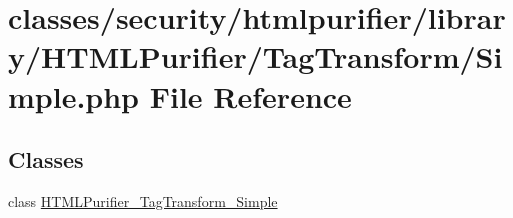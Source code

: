 \hypertarget{Simple_8php}{\section{classes/security/htmlpurifier/library/\+H\+T\+M\+L\+Purifier/\+Tag\+Transform/\+Simple.php File Reference}
\label{Simple_8php}
}
\subsection*{Classes}
\begin{DoxyCompactItemize}
\item 
class \hyperlink{classHTMLPurifier__TagTransform__Simple}{H\+T\+M\+L\+Purifier\+\_\+\+Tag\+Transform\+\_\+\+Simple}
\end{DoxyCompactItemize}
